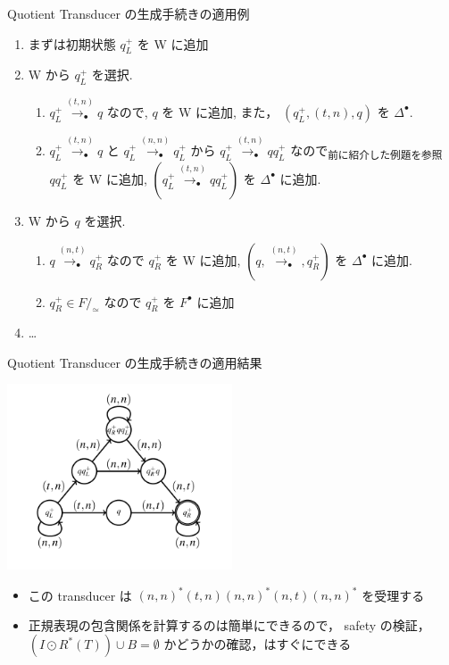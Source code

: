 \documentclass[presentation, xetex]{beamer}
\begin{document}
\begin{frame}[label={sec:orgc19f115}]{Quotient Transducer の生成手続きの適用例}
\begin{enumerate}
\item まずは初期状態 \(q_L^+\) を W に追加
\item W から \(q_L^+\) を選択.
\begin{enumerate}
\item \(q_L^+ \overset{(t,n)}{\longrightarrow_\bullet} q\) なので,
\(q\) を W に追加,
また， \((q_L^+, (t, n), q)\) を \(\Delta^\bullet\).
\item \(q_L^+ \overset{(t, n)}{\longrightarrow_\bullet} q\) と
\(q_L^+ \overset{(n,n)}{\longrightarrow_\bullet} q_L^+\)
から
\(q_L^+ \overset{(t, n)}{\longrightarrow_\bullet} q q_L^+\) なので\textsubscript{前に紹介した例題を参照}\\
\(q q_L^+\) を W に追加,
\((q_L^+ \overset{(t, n)}{\longrightarrow_\bullet} q q_L^+)\) を \(\Delta^\bullet\) に追加.
\end{enumerate}
\item W から \(q\) を選択.
\begin{enumerate}
\item \(q \overset{(n,t)}{\longrightarrow_\bullet} q_R^+\) なので
\(q_R^+\) を W に追加,
\((q, \overset{(n, t)}{\longrightarrow_\bullet}, q_R^+)\)
を \(\Delta^\bullet\) に追加.
\item \(q_R^+ \in F/_\simeq\) なので \(q_R^+\) を \(F^\bullet\) に追加
\end{enumerate}
\item \ldots{}
\end{enumerate}
\end{frame}


\begin{frame}[label={sec:orgf37402e}]{Quotient Transducer の生成手続きの適用結果}
\begin{center}
\includegraphics[width=0.5\textwidth]{./images/quoting-rmc-result.png}
\end{center}

\begin{itemize}
\item この transducer は \((n, n)^* (t, n) (n, n)^* (n, t) (n, n)^*\) を受理する
\item 正規表現の包含関係を計算するのは簡単にできるので，
safety の検証， \((I \odot R^*(T)) \cup B = \emptyset\) かどうかの確認，はすぐにできる
\end{itemize}
\end{frame}
\end{document}
